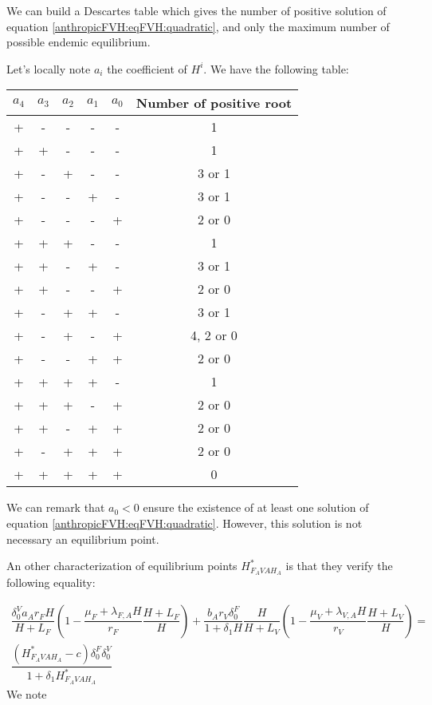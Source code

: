 \documentclass{article}
\newcommand{\lfa}{\lambda_{F, A}}
\newcommand{\lva}{\lambda_{V, A}}
\newcommand{\df}{\delta_0^F}
\newcommand{\dv}{\delta_0^V}
\begin{document}
We can build a Descartes table which gives the number of positive solution of equation \eqref{anthropicFVH:eqFVH:quadratic}, and only the maximum number of possible endemic equilibrium.

\bigskip

Let's locally note $a_i$ the coefficient of $H^i$. We have the following table:

\begin{table}[!h]
\centering
\begin{tabular}{c|c|c|c|c|c}
$a_4$& $a_3$ & $a_2$ & $a_1$ & $a_0$ & Number of positive root \\
\hline
+ & - & - & - & - & 1 \\
+ & + & - & - & - & 1 \\
+ & - & + & - & - & 3 or 1 \\
+ & - & - & + & - & 3 or 1 \\
+ & - & - & - & + & 2 or 0 \\
+ & + & + & - & - & 1 \\
+ & + & - & + & - & 3 or 1 \\
+ & + & - & - & + & 2 or 0 \\
+ & - & + & + & - & 3 or 1 \\
+ & - & + & - & + & 4, 2 or 0 \\
+ & - & - & + & + & 2 or 0 \\
+ & + & + & + & - & 1 \\
+ & + & + & - & + & 2 or 0 \\
+ & + & - & + & + & 2 or 0 \\
+ & - & + & + & + & 2 or 0 \\
+ & + & + & + & + & 0 \\
\end{tabular}
\end{table}

We can remark that $a_0 < 0$ ensure the existence of at least one solution of equation \eqref{anthropicFVH:eqFVH:quadratic}. However, this solution is not necessary an equilibrium point.

An other characterization of equilibrium points $H^*_{F_AVAH_A}$ is that they verify the following equality:

\begin{multline}
\dfrac{\dv a_A r_F H}{H + L_F}\left(1 - \dfrac{\mu_F + \lfa H}{r_F}\dfrac{H + L_F}{H}\right) + \dfrac{ b_A r_V \df}{1+ \delta_1 H} \dfrac{H}{H + L_V}\left(1  - \dfrac{\mu_V + \lva H}{r_V}\dfrac{H + L_V}{H} \right) = \\
\dfrac{(H^*_{F_AVAH_A}- c) \df \dv}{1 + \delta_1 H^*_{F_AVAH_A}}
\label{anthropicFVH:eqFVH:functional}
\end{multline}
We note 
\end{document}
